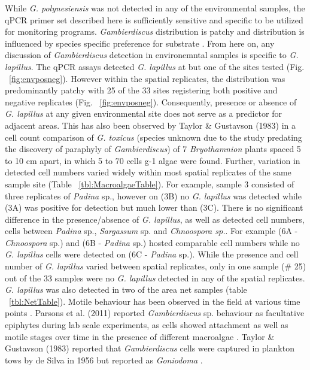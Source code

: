 \documentclass[12pt]{article}
\begin{document}
While \emph{G. polynesiensis} was not detected in any of the environmental samples, the qPCR primer set described here is sufficiently sensitive and specific to be utilized for monitoring programs. \emph{Gambierdiscus} distribution is patchy and distribution is influenced by species specific preference for substrate \cite{parsons2011examination}. From here on, any discussion of \emph{Gambierdiscus} detection in environemntal samples is specific to \emph{G. lapillus}.
The qPCR assays detected \emph{G. lapillus} at but one of the sites tested (Fig. ~\ref{fig:envposneg}). However within the spatial replicates, the distribution was predominantly patchy with 25 of the 33 sites registering both positive and negative replicates (Fig. ~\ref{fig:envposneg}). Consequently, presence or absence of \emph{G. lapillus} at any given environmental site does not serve as a predictor for adjacent areas. This has also been observed by Taylor \& Gustavson (1983) in a cell count comparison of \emph{G. toxicus} (species unknown due to the study predating the discovery of paraphyly of \emph{Gambierdiscus}) of 7 \emph{Bryothamnion} plants spaced 5 to 10 cm apart, in which 5 to 70 cells g-1 algae were found.
Further, variation in detected cell numbers varied widely within most spatial replicates of the same sample site (Table ~\ref{tbl:MacroalgaeTable}). For example, sample 3 consisted of three replicates of \emph{Padina} sp., however on (3B) no \emph{G. lapillus} was detected while (3A) was positive for detection but much lower than (3C).
There is no significant difference in the presence/absence of \emph{G. lapillus}, as well as detected cell numbers, cells between \emph{Padina} sp., \emph{Sargassum} sp. and \emph{Chnoospora sp.}. For example (6A - \emph{Chnoospora} sp.) and (6B - \emph{Padina} sp.) hosted comparable cell numbers while no \emph{G. lapillus} cells were detected on (6C - \emph{Padina} sp.). While the presence and cell number of \emph{G. lapillus} varied between spatial replicates, only in one sample (\# 25) out of the 33 samples were no \emph{G. lapillus} detected in any of the spatial replicates. 
\emph{G. lapillus} was also detected in two of the area net samples (table ~\ref{tbl:NetTable}). Motile behaviour has been observed in the field at various time points \cite{yasumoto1977finding,bomber1987ecology}. Parsons et al. (2011) reported \emph{Gambierdiscus} sp. behaviour as facultative epiphytes during lab scale experiments, as cells showed attachment as well as motile stages over time in the presence of different macroalgae \cite{parsons2011examination}. Taylor \& Gustavson (1983) reported that \emph{Gambierdiscus} cells were captured in plankton tows by de Silva in 1956 but reported as \emph{Goniodoma} \cite{taylor1986underwater}. %
\end{document}

